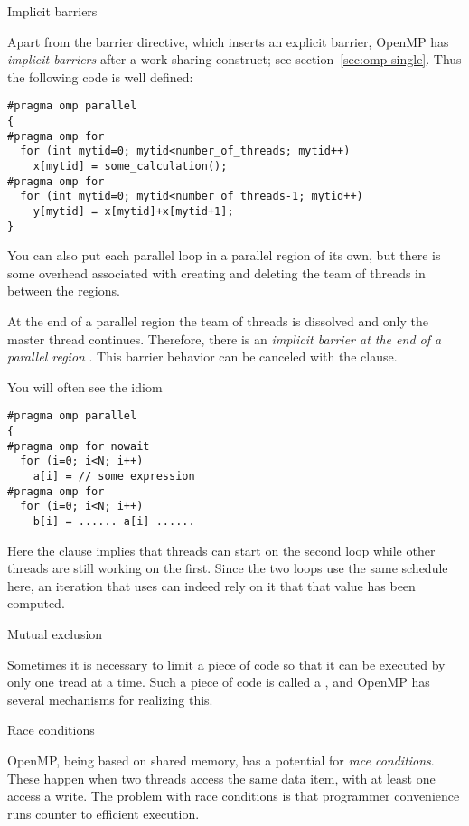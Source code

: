  {Implicit barriers}
\label{sec:ompbarrierimpl}

Apart from the barrier directive, which inserts an explicit barrier,
OpenMP has \emph{implicit barriers} after
a work sharing construct; see section~\ref{sec:omp-single}.
Thus the following code is well defined:
\begin{lstlisting}
#pragma omp parallel 
{
#pragma omp for
  for (int mytid=0; mytid<number_of_threads; mytid++)
    x[mytid] = some_calculation();
#pragma omp for
  for (int mytid=0; mytid<number_of_threads-1; mytid++)
    y[mytid] = x[mytid]+x[mytid+1];
}
\end{lstlisting}

You can also put each parallel loop in a parallel region of its own,
but there is some overhead associated with creating and deleting the
team of threads in between the regions.

At the end of a parallel region the team of threads is dissolved and
only the master thread continues. Therefore, there is an
\emph{implicit barrier at the end of a parallel region}%
.
This barrier behavior can be canceled with the 
clause.

You will often see the idiom
\begin{lstlisting}
#pragma omp parallel
{
#pragma omp for nowait
  for (i=0; i<N; i++)
    a[i] = // some expression
#pragma omp for
  for (i=0; i<N; i++)
    b[i] = ...... a[i] ......
\end{lstlisting}
Here the  clause implies that threads can start on the second loop
while other threads are still working on the first. Since the two loops use the same
schedule here, an iteration that uses  can indeed rely on it that that 
value has been computed.

 {Mutual exclusion}

Sometimes it is necessary to limit a piece of code
so that it can be executed by only one tread at a time.
Such a piece of code is called a , and
OpenMP has several mechanisms for realizing this.

 {Race conditions}

OpenMP, being based on shared memory, has a potential for
\emph{race conditions}.
These happen when two threads access the same data
item, with at least one access a write.
The problem with race conditions is that programmer convenience
runs counter to efficient execution.

